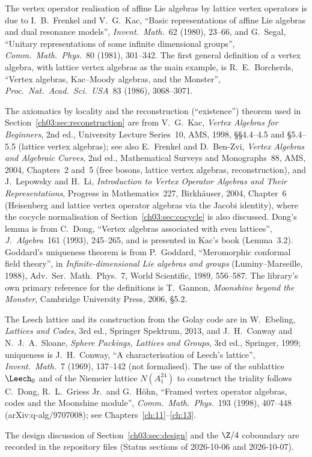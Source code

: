 The vertex operator realisation of affine Lie algebras by lattice vertex operators is due to
I.~B.~Frenkel and V.~G.~Kac, ``Basic representations of affine Lie algebras and dual resonance
models'', \emph{Invent.\ Math.}~62 (1980), 23--66, and G.~Segal, ``Unitary representations of some
infinite dimensional groups'', \emph{Comm.\ Math.\ Phys.}~80 (1981), 301--342. The first general
definition of a vertex algebra, with lattice vertex algebras as the main example, is
R.~E.~Borcherds, ``Vertex algebras, Kac--Moody algebras, and the Monster'', \emph{Proc.\ Nat.\
Acad.\ Sci.\ USA}~83 (1986), 3068--3071.

The axiomatics by locality and the reconstruction (``existence'') theorem used in
Section~\ref{ch03:sec:reconstruction} are from V.~G.~Kac, \emph{Vertex Algebras for Beginners},
2nd ed., University Lecture Series~10, AMS, 1998, \S\S4.4--4.5 and \S5.4--5.5 (lattice vertex
algebras); see also E.~Frenkel and D.~Ben-Zvi, \emph{Vertex Algebras and Algebraic Curves},
2nd ed., Mathematical Surveys and Monographs~88, AMS, 2004, Chapters~2 and~5 (free bosons,
lattice vertex algebras, reconstruction), and J.~Lepowsky and H.~Li, \emph{Introduction to Vertex
Operator Algebras and Their Representations}, Progress in Mathematics~227, Birkh\"auser, 2004,
Chapter~6 (Heisenberg and lattice vertex operator algebras via the Jacobi identity), where
the cocycle normalisation of Section~\ref{ch03:sec:cocycle} is also discussed. Dong's lemma is from
C.~Dong, ``Vertex algebras associated with even lattices'', \emph{J.\ Algebra}~161 (1993),
245--265, and is presented in Kac's book (Lemma~3.2). Goddard's uniqueness theorem is from
P.~Goddard, ``Meromorphic conformal field theory'', in \emph{Infinite-dimensional Lie algebras and
groups} (Luminy--Marseille, 1988), Adv.\ Ser.\ Math.\ Phys.~7, World Scientific, 1989, 556--587.
The library's own primary reference for the definitions is T.~Gannon, \emph{Moonshine beyond the
Monster}, Cambridge University Press, 2006, \S5.2.

The Leech lattice and its construction from the Golay code are in W.~Ebeling, \emph{Lattices and
Codes}, 3rd ed., Springer Spektrum, 2013, and J.~H.~Conway and N.~J.~A.~Sloane, \emph{Sphere
Packings, Lattices and Groups}, 3rd ed., Springer, 1999; uniqueness is J.~H.~Conway, ``A
characterisation of Leech's lattice'', \emph{Invent.\ Math.}~7 (1969), 137--142 (not formalised).
The use of the sublattice $\Leech_0$ and of the Niemeier lattice $N(A_1^{24})$ to construct the
triality follows C.~Dong, R.~L.~Griess Jr.\ and G.~H\"ohn, ``Framed vertex operator algebras,
codes and the Moonshine module'', \emph{Comm.\ Math.\ Phys.}~193 (1998), 407--448
(arXiv:q-alg/9707008); see Chapters~\ref{ch:11}--\ref{ch:13}.

The design discussion of Section~\ref{ch03:sec:design} and the $\Z/4$ coboundary are recorded in
the repository files \leanpath{Notes/M8GluingPlan.md} (Status sections of 2026-10-06 and
2026-10-07).
\endgroup
